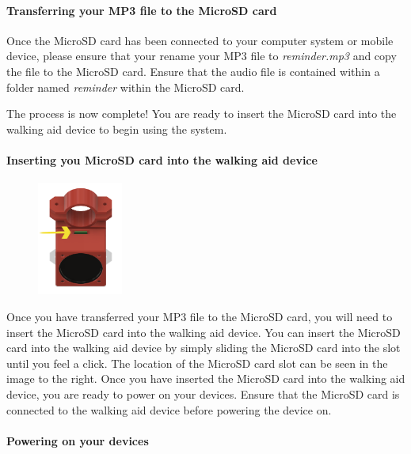 				\paragraph{Transferring your MP3 file to the MicroSD card}\mbox{}

				Once the MicroSD card has been connected to your computer system or mobile device, please ensure that your rename your MP3 file to \textit{reminder.mp3} and copy the file to the MicroSD card. Ensure that the audio file is contained within a folder named \textit{reminder} within the MicroSD card.

				The process is now complete! You are ready to insert the MicroSD card into the walking aid device to begin using the system.

				\paragraph{Inserting you MicroSD card into the walking aid device}\mbox{}

				\begin{figure}
					\vspace{-3.5em}
					\centering
					\includegraphics[width=0.25\textwidth]{graphics/sd_arrow.png}
				\end{figure}

				Once you have transferred your MP3 file to the MicroSD card, you will need to insert the MicroSD card into the walking aid device. You can insert the MicroSD card into the walking aid device by simply sliding the MicroSD card into the slot until you feel a click. The location of the MicroSD card slot can be seen in the image to the right. Once you have inserted the MicroSD card into the walking aid device, you are ready to power on your devices. Ensure that the MicroSD card is connected to the walking aid device before powering the device on.

				\paragraph{Powering on your devices}\mbox{}

